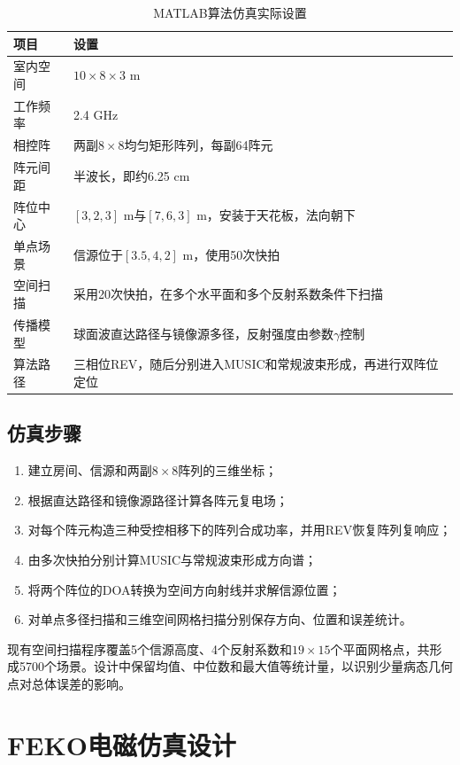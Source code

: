 \documentclass[UTF8,a4paper,12pt]{ctexart}
\begin{document}
\begin{table}[htbp]
\centering
\caption{MATLAB算法仿真实际设置}
\label{tab:matlab-setting}
\begin{tabularx}{\textwidth}{p{3.2cm}Y}
\toprule
项目 & 设置\\
\midrule
室内空间 & $10\times8\times3$ m\\
工作频率 & 2.4 GHz\\
相控阵 & 两副$8\times8$均匀矩形阵列，每副64阵元\\
阵元间距 & 半波长，即约6.25 cm\\
阵位中心 & $[3,2,3]$ m与$[7,6,3]$ m，安装于天花板，法向朝下\\
单点场景 & 信源位于$[3.5,4,2]$ m，使用50次快拍\\
空间扫描 & 采用20次快拍，在多个水平面和多个反射系数条件下扫描\\
传播模型 & 球面波直达路径与镜像源多径，反射强度由参数$\gamma$控制\\
算法路径 & 三相位REV，随后分别进入MUSIC和常规波束形成，再进行双阵位定位\\
\bottomrule
\end{tabularx}
\end{table}

\subsection{仿真步骤}

\begin{enumerate}
  \item 建立房间、信源和两副$8\times8$阵列的三维坐标；
  \item 根据直达路径和镜像源路径计算各阵元复电场；
  \item 对每个阵元构造三种受控相移下的阵列合成功率，并用REV恢复阵列复响应；
  \item 由多次快拍分别计算MUSIC与常规波束形成方向谱；
  \item 将两个阵位的DOA转换为空间方向射线并求解信源位置；
  \item 对单点多径扫描和三维空间网格扫描分别保存方向、位置和误差统计。
\end{enumerate}

现有空间扫描程序覆盖5个信源高度、4个反射系数和$19\times15$个平面网格点，共形成5700个场景。设计中保留均值、中位数和最大值等统计量，以识别少量病态几何点对总体误差的影响。

\clearpage
\section{FEKO电磁仿真设计}
\end{document}
